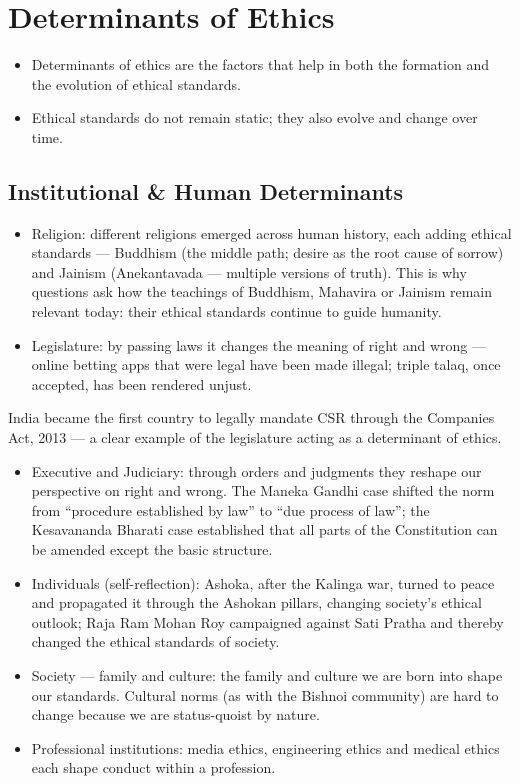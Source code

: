 \section{Determinants of Ethics}

\begin{KeyConcept}
\begin{itemize}
\item Determinants of ethics are the factors that help in both the formation and the evolution of ethical standards.
\item Ethical standards do not remain static; they also evolve and change over time.
\end{itemize}
\end{KeyConcept}

\subsection{Institutional \& Human Determinants}

\begin{itemize}
\item Religion: different religions emerged across human history, each adding ethical standards --- Buddhism (the middle path; desire as the root cause of sorrow) and Jainism (Anekantavada --- multiple versions of truth). This is why questions ask how the teachings of Buddhism, Mahavira or Jainism remain relevant today: their ethical standards continue to guide humanity.
\item Legislature: by passing laws it changes the meaning of right and wrong --- online betting apps that were legal have been made illegal; triple talaq, once accepted, has been rendered unjust.
\end{itemize}

\begin{GovtPolicy}
India became the first country to legally mandate CSR through the Companies Act, 2013 --- a clear example of the legislature acting as a determinant of ethics.
\end{GovtPolicy}

\begin{itemize}
\item Executive and Judiciary: through orders and judgments they reshape our perspective on right and wrong. The Maneka Gandhi case shifted the norm from ``procedure established by law'' to ``due process of law''; the Kesavananda Bharati case established that all parts of the Constitution can be amended except the basic structure.
\item Individuals (self-reflection): Ashoka, after the Kalinga war, turned to peace and propagated it through the Ashokan pillars, changing society's ethical outlook; Raja Ram Mohan Roy campaigned against Sati Pratha and thereby changed the ethical standards of society.
\item Society --- family and culture: the family and culture we are born into shape our standards. Cultural norms (as with the Bishnoi community) are hard to change because we are status-quoist by nature.
\item Professional institutions: media ethics, engineering ethics and medical ethics each shape conduct within a profession.
\end{itemize}

